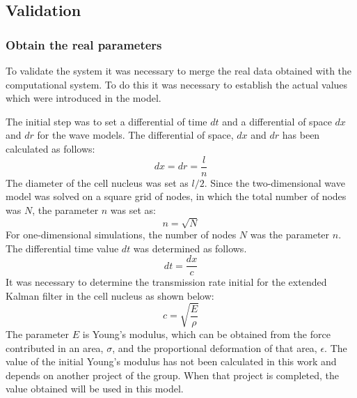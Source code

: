 \documentclass[12pt, a4paper]{article} %
\begin{document}
	\setlength{\parskip}{0mm}
	
	\subsection{Validation}
	
	\subsubsection{Obtain the real parameters}
	
	To validate the system it was necessary to merge the real data obtained with the computational system. To do this it was necessary to establish the actual values which were introduced in the model.
	
	\setlength{\parskip}{4mm}
	
	The initial step was to set a differential of time $dt$ and a differential of space $dx$ and $dr$ for the wave models. The differential of space, $dx$ and $dr$ has been calculated as follows:
	\begin{equation} \label{eqn:dx}
		dx = dr = \frac{l}{n}
	\end{equation}
	The diameter of the cell nucleus was set as $l/2$. Since the two-dimensional wave model was solved on a square grid of nodes, in which the total number of nodes was $N$, the parameter $n$ was set as:
	\begin{equation} \label{eqn:n}
		n = \sqrt{N}
	\end{equation}
	For one-dimensional simulations, the number of nodes $N$ was the parameter $n$. The differential time value $dt$ was determined as follows.
	\begin{equation} \label{eqn:dt}
		dt = \frac{dx}{c}
	\end{equation}
	It was necessary to determine the transmission rate initial for the extended Kalman filter in the cell nucleus as shown below:
	\begin{equation} \label{eqn:c}
		c = \sqrt{\frac{E}{\rho}}
	\end{equation}
	The parameter $E$ is Young's modulus, which can be obtained from the force contributed in an area, $\sigma$, and the proportional deformation of that area, $\epsilon$. The value of the initial Young's modulus has not been calculated in this work and depends on another project of the group. When that project is completed, the value obtained will be used in this model.
	
\end{document}
